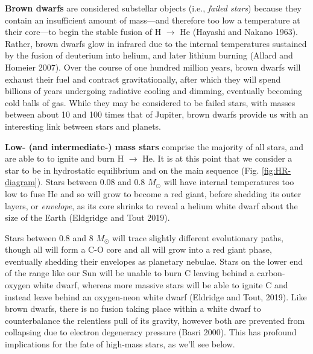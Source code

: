 \documentclass[1.5,11pt]{beavtex}
\begin{document}
\textbf{Brown dwarfs} are considered substellar objects (i.e., \textit{failed stars}) because they contain an insufficient amount of mass---and therefore too low a temperature at their core---to begin the stable fusion of H $\rightarrow$ He (Hayashi and Nakano 1963). Rather, brown dwarfs glow in infrared due to the internal temperatures sustained by the fusion of deuterium into helium, and later lithium burning (Allard and Homeier 2007). Over the course of one hundred million years, brown dwarfs will exhaust their fuel and contract gravitationally, after which they will spend billions of years undergoing radiative cooling and dimming, eventually becoming cold balls of gas. While they may be considered to be failed stars, with masses between about 10 and 100 times that of Jupiter, brown dwarfs provide us with an interesting link between stars and planets.

\textbf{Low- (and intermediate-) mass stars} comprise the majority of all stars, and are able to to ignite and burn H $\rightarrow$ He. It is at this point that we consider a star to be in hydrostatic equilibrium and on the main sequence (Fig. \ref{fig:HR-diagram}). Stars between 0.08 and 0.8 \(M_\odot\) will have internal temperatures too low to fuse He and so will grow to become a red giant, before shedding its outer layers, or \textit{envelope}, as its core shrinks to reveal a helium white dwarf about the size of the Earth (Eldgridge and Tout 2019). 

Stars between 0.8 and 8 \(M_\odot\) will trace slightly different evolutionary paths, though all will form a C-O core and all will grow into a red giant phase, eventually shedding their envelopes as planetary nebulae. Stars on the lower end of the range like our Sun will be unable to burn C leaving behind a carbon-oxygen white dwarf, whereas more massive stars will be able to ignite C and instead leave behind an oxygen-neon white dwarf (Eldridge and Tout, 2019). Like brown dwarfs, there is no fusion taking place within a white dwarf to counterbalance the relentless pull of its gravity, however both are prevented from collapsing due to electron degeneracy pressure (Basri 2000). This has profound implications for the fate of high-mass stars, as we'll see below.
\end{document}
